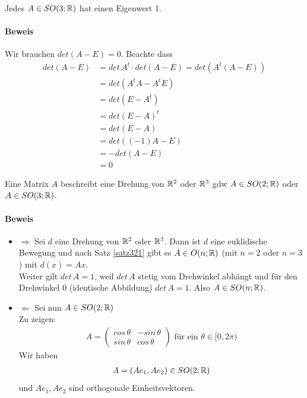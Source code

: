 \begin{lemma} %
\label{lemma324}
Jedes $A \in SO(3; \mathbb{R})$ hat einen Eigenwert 1.
\end{lemma}

\paragraph{Beweis}
Wir brauchen $det(A-E) = 0$. Beachte dass
\begin{align}
det(A-E) &= det\, A^t\cdot det(A-E) = det(A^t(A-E)) \\
&= det(A^t A - A^t E) \\
&= det(E-A^t) \\
&= det(E-A)^t \\
&= det(E-A) \\
&= det((-1) A-E) \\
&= - det(A-E) \\
&= 0
\end{align}

\begin{satz} %
\label{satz325}
Eine Matrix $A$ beschreibt eine Drehung von $\mathbb{R}^2$ oder $\mathbb{R}^3$ gdw $A \in SO(2; \mathbb{R})$ oder $A \in SO(3; \mathbb{R})$.
\end{satz}

\paragraph{Beweis}
\begin{itemize}
\item $\Rightarrow$ Sei $d$ eine Drehung von $\mathbb{R}^2$ oder $\mathbb{R}^3$. Dann ist $d$ eine euklidische Bewegung und nach Satz \ref{satz321} gibt es $A \in O(n; \mathbb{R})$ (mit $n=2$ oder $n=3$) mit $d(x) = Ax$. \\
Weiter gilt $det\, A = 1$, weil $det\, A$ stetig vom Drehwinkel abhängt und für den Drehwinkel $0$ (identische Abbildung) $det\, A=1$. Also $A \in SO(n; \mathbb{R})$.
\item $\Leftarrow$ Sei nun $A \in SO(2; \mathbb{R})$\\
Zu zeigen:
\begin{align}
A = \begin{pmatrix} cos\, \theta & -sin\, \theta \\ sin\, \theta & cos\, \theta \end{pmatrix} \text{ für ein } \theta \in [0, 2 \pi)
\end{align}
Wir haben
\begin{align}
A = (A e_1, A e_2) \in SO(2; \mathbb{R})
\end{align}
und $A e_1, A e_2$ sind orthogonale Einheitsvektoren. 
\end{itemize}

